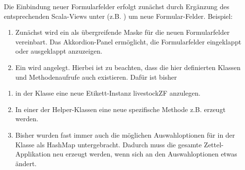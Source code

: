 \documentclass[letterpaper,10pt,ngerman]{sphinxmanual}
\begin{document}
Die Einbindung neuer Formularfelder erfolgt zunächst durch Ergänzung des entsprechenden Scala-Views unter  (z.B. )
um neue Formular-Felder. Beispiel:

%
\begin{sphinxVerbatim}[commandchars=\\\{\}]
         
         
\end{sphinxVerbatim}
\begin{enumerate}
\item {} 
Zunächst wird ein  als übergreifende Maske für die neuen Formularfelder vereinbart. Das Akkordion-Panel ermöglicht, die Formularfelder eingeklappt oder ausgeklappt anzuzeigen.

\item {} 
Ein  wird angelegt. Hierbei ist zu beachten, dass die hier definierten Klassen und Methodenaufrufe auch existieren. Dafür ist bisher

\end{enumerate}
\begin{enumerate}
\item {} 
in der Klasse  eine neue Etikett-Instanz livestockZF anzulegen. 

\item {} 
In einer der Helper-Klassen eine neue spezifische Methode z.B.  erzeugt werden.

\item {} 
Bisher wurden fast immer auch die möglichen Auswahloptionen für  in der Klasse  als HashMap untergebracht. Dadurch muss die gesamte Zettel-Applikation neu erzeugt werden, wenn sich an den Auswahloptionen etwas ändert.

\end{enumerate}
\end{document}

